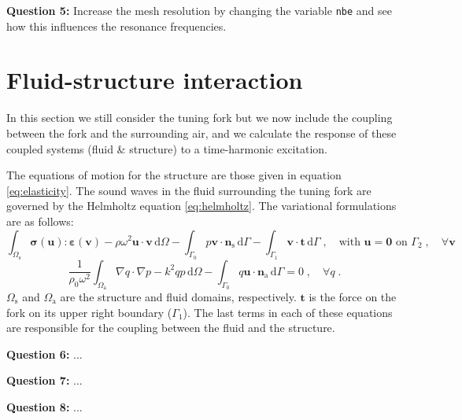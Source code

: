 \documentclass[english,3p]{elsarticle}
\newcommand{\code}[1]{\texttt{#1}}
\newcommand{\dd}{\mathrm{d}}
\begin{document}
\textbf{Question 5:} Increase the mesh resolution by changing the variable \code{nbe} and see how this influences the resonance frequencies.

\clearpage

\section{Fluid-structure interaction}

In this section we still consider the tuning fork but we now include the coupling between the fork and the surrounding air, and we calculate the response of these coupled systems (fluid \& structure) to a time-harmonic excitation.

The equations of motion for the structure are those given in equation \eqref{eq:elasticity}.
The sound waves in the fluid surrounding the tuning fork are governed by the Helmholtz equation \eqref{eq:helmholtz}.
The variational formulations are as follows:
$$
\int_{\Omega_\mathrm{s}} \boldsymbol{\sigma}(\mathbf{u}):\boldsymbol{\varepsilon}(\mathbf{v}) - \rho\omega^2\mathbf{u}\cdot\mathbf{v}\,\dd\Omega - \int_{\Gamma_0} p \mathbf{v}\cdot\mathbf{n}_\mathrm{s}\,\dd\Gamma
-\int_{\Gamma_1} \mathbf{v}\cdot\mathbf{t}\,\dd\Gamma
\;,\quad
\text{with } \mathbf{u}=\mathbf{0} \text{ on } \Gamma_2
\;,\quad
\forall \mathbf{v}
$$
$$
\frac{1}{\rho_0\omega^2}\int_{\Omega_\mathrm{a}} \nabla q\cdot\nabla p - k^2qp \,\dd\Omega - \int_{\Gamma_0} q\mathbf{u}\cdot\mathbf{n}_\mathrm{a}\,\dd\Gamma
=0
\;,\quad
\forall q
\;.
$$
$\Omega_\mathrm{s}$ and $\Omega_\mathrm{a}$ are the structure and fluid domains, respectively.
$\mathbf{t}$ is the force on the fork on its upper right boundary ($\Gamma_1$).
The last terms in each of these equations are responsible for the coupling between the fluid and the structure.

\textbf{Question 6:} ...

\textbf{Question 7:} ...

\textbf{Question 8:} ...
\end{document}
